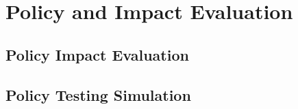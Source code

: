 \documentclass[12pt,a4paper]{article}
\begin{document}
\newpage
\section{Policy and Impact Evaluation}


\subsection{Policy Impact Evaluation}


\subsection{Policy Testing Simulation}

\end{document}
